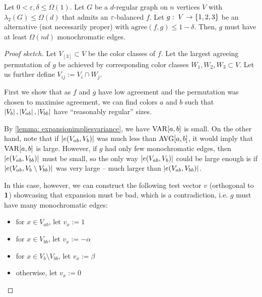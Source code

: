 \begin{lemma}[Informal]\label{lemma: vertexvsedgeviolation}
    Let $0<\varepsilon, \delta\leq \Omega(1)$. Let $G$ be a $d$-regular graph on $n$ vertices $V$ with $\lambda_2(G)\leq \Omega(d)$ that admits an $\varepsilon$-balanced \tcl $f$. Let $g:\; V\to \left\{1, 2, 3\right\}$ be an alternative (not necessarily proper) \tcl with $\text{agree}(f, g)\leq 1-\delta$. Then, $g$ must have at least $\Omega(nd)$ monochromatic edges. 
\end{lemma}

\begin{proof}[Proof sketch]
    Let $V_{[3]}\subset V$ be the color classes of $f$. Let the largest agreeing permutation of $g$ be achieved by corresponding color classes $W_1, W_2, W_3\subset V$. Let us further define $V_{ij}:=V_i\cap W_j$.

    First we show that as $f$ and $g$ have low agreement and the permutation was chosen to maximise agreement, we can find colors $a$ and $b$ such that $\left\lvert V_b\right\rvert, \left\lvert V_{ab}\right\rvert, \left\lvert V_{bb}\right\rvert$ have ``reasonably regular'' sizes.

    By \cref{lemma: expansionimpliesvariance}, we have $\VAR{a}{b}$ is small. On the other hand, note that if $\left\lvert e(V_{ab}, V_b)\right\rvert$ was much less than $\AVG{a}{b}$, it would imply that $\VAR{a}{b}$ is large. However, if $g$ had only few monochromatic edges, then $\left\lvert e(V_{ab}, V_{bb})\right\rvert$ must be small, so the only way $\left\lvert e(V_{ab}, V_b)\right\rvert$ could be large enough is if $\left\lvert e(V_{ab}, V_b\setminus V_{bb})\right\rvert$ was very large -- much larger than $\left\lvert e(V_{ab}, V_{bb})\right\rvert$.

    In this case, however, we can construct the following test vector $v$ (orthogonal to $\mathbf{1}$) showcasing that expansion must be bad, which is a contradiction, i.e. $g$ must have many monochromatic edges:

    \begin{itemize}
        \item for $x\in V_{ab}$, let $v_x:=1$
        \item for $x\in V_{bb}$, let $v_x:=-\alpha$
        \item for $x\in V_{b}\setminus V_{bb}$, let $v_x:=\beta$
        \item otherwise, let $v_x:=0$
    \end{itemize}
\end{proof}







